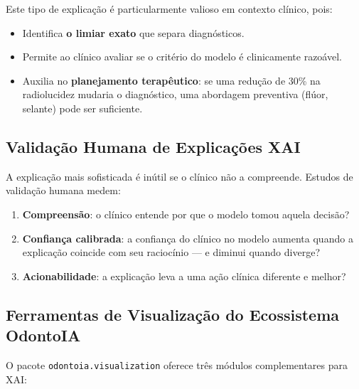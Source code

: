 Este tipo de explicação é particularmente valioso em contexto clínico,
pois:

\begin{itemize}
  \item Identifica \textbf{o limiar exato} que separa diagnósticos.
  \item Permite ao clínico avaliar se o critério do modelo é
    clinicamente razoável.
  \item Auxilia no \textbf{planejamento terapêutico}: se uma redução de
    30\% na radiolucidez mudaria o diagnóstico, uma abordagem preventiva
    (flúor, selante) pode ser suficiente.
\end{itemize}

\subsection{Validação Humana de Explicações XAI}

A explicação mais sofisticada é inútil se o clínico não a compreende.
Estudos de validação humana medem:

\begin{enumerate}
  \item \textbf{Compreensão}: o clínico entende por que o modelo tomou
    aquela decisão?
  \item \textbf{Confiança calibrada}: a confiança do clínico no modelo
    aumenta quando a explicação coincide com seu raciocínio — e diminui
    quando diverge?
  \item \textbf{Acionabilidade}: a explicação leva a uma ação clínica
    diferente e melhor?
\end{enumerate}


\subsection{Ferramentas de Visualização do Ecossistema OdontoIA}

O pacote \texttt{odontoia.visualization} oferece três módulos
complementares para XAI:

